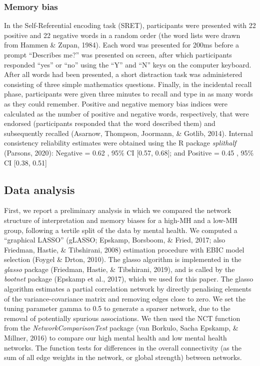 \documentclass[
  english,
  man,floatsintext]{apa6}
\begin{document}
\hypertarget{memory-bias}{%
\subsubsection{Memory bias}\label{memory-bias}}

In the Self-Referential encoding task (SRET), participants were presented with 22 positive and 22 negative words in a random order (the word lists were drawn from Hammen \& Zupan, 1984). Each word was presented for 200ms before a prompt \enquote{Describes me?} was presented on screen, after which participants responded \enquote{yes} or \enquote{no} using the \enquote{Y} and \enquote{N} keys on the computer keyboard. After all words had been presented, a short distraction task was administered consisting of three simple mathematics questions. Finally, in the incidental recall phase, participants were given three minutes to recall and type in as many words as they could remember. Positive and negative memory bias indices were calculated as the number of positive and negative words, respectively, that were endorsed (participants responded that the word described them) and subsequently recalled (Asarnow, Thompson, Joormann, \& Gotlib, 2014). Internal consistency reliability estimates were obtained using the R package \emph{splithalf} (Parsons, 2020): Negative = 0.62 , 95\% CI {[}0.57, 0.68{]}; and Positive = 0.45 , 95\% CI {[}0.38, 0.51{]}

\hypertarget{data-analysis}{%
\subsection{Data analysis}\label{data-analysis}}

First, we report a preliminary analysis in which we compared the network structure of interpretation and memory biases for a high-MH and a low-MH group, following a tertile split of the data by mental health. We computed a \enquote{graphical LASSO} (gLASSO; Epskamp, Borsboom, \& Fried, 2017; also Friedman, Hastie, \& Tibshirani, 2008) estimation procedure with EBIC model selection (Foygel \& Drton, 2010). The glasso algorithm is implemented in the \emph{glasso} package (Friedman, Hastie, \& Tibshirani, 2019), and is called by the \emph{bootnet} package (Epskamp et al., 2017), which we used for this paper. The glasso algorithm estimates a partial correlation network by directly penalising elements of the variance-covariance matrix and removing edges close to zero. We set the tuning parameter gamma to 0.5 to generate a sparser network, due to the removal of potentially spurious associations. We then used the NCT function from the \emph{NetworkComparisonTest} package (van Borkulo, Sacha Epskamp, \& Millner, 2016) to compare our high mental health and low mental health networks. The function tests for differences in the overall connectivity (as the sum of all edge weights in the network, or global strength) between networks.
\end{document}
